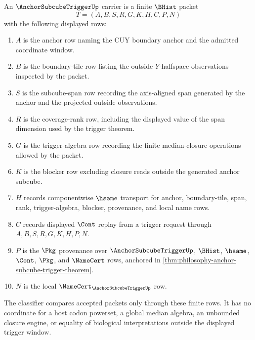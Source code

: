 \begin{definition}
\label{def:anchor-subcube-trigger-carrier}
An $\AnchorSubcubeTriggerUp$ carrier is a finite $\BHist$ packet
$$
T=(A,B,S,R,G,K,H,C,P,N)
$$
with the following displayed rows:
\begin{enumerate}
\item $A$ is the anchor row naming the $\mathrm{CUY}$ boundary anchor and the admitted coordinate window.
\item $B$ is the boundary-tile row listing the outside $Y$-halfspace observations inspected by the packet.
\item $S$ is the subcube-span row recording the axis-aligned span generated by the anchor and the projected outside observations.
\item $R$ is the coverage-rank row, including the displayed value of the span dimension used by the trigger theorem.
\item $G$ is the trigger-algebra row recording the finite median-closure operations allowed by the packet.
\item $K$ is the blocker row excluding closure reads outside the generated anchor subcube.
\item $H$ records componentwise $\hsame$ transport for anchor, boundary-tile, span, rank, trigger-algebra, blocker, provenance, and local name rows.
\item $C$ records displayed $\Cont$ replay from a trigger request through $A,B,S,R,G,K,H,P,N$.
\item $P$ is the $\Pkg$ provenance over $\AnchorSubcubeTriggerUp$, $\BHist$, $\hsame$, $\Cont$, $\Pkg$, and $\NameCert$ rows, anchored in \autoref{thm:philosophy-anchor-subcube-trigger-theorem}.
\item $N$ is the local $\NameCert_{\AnchorSubcubeTriggerUp}$ row.
\end{enumerate}
The classifier compares accepted packets only through these finite rows. It has no coordinate for a host codon powerset, a global median algebra, an unbounded closure engine, or equality of biological interpretations outside the displayed trigger window.
\end{definition}

